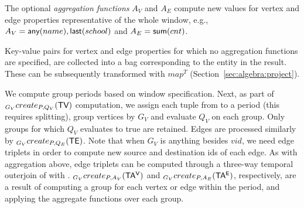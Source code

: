 The optional {\em aggregation functions} $A_V$ and $A_E$ compute new
values for vertex and edge properties representative of
the whole window, e.g., $A_V=\textsf{any}(name), \textsf{last}(school)$
and $A_E=\textsf{sum}(cnt)$.
%
 
Key-value pairs for vertex and edge properties for which no
aggregation functions are specified, are collected into a bag
corresponding to the entity in the result.  These can be subsequently
transformed with $map^T$ (Section~\ref{sec:algebra:project}).


We compute group periods based on window specification.  Next, as part
of $_{G_V}create_{P,Q_V}(\textsf{TV})$ computation, we assign each tuple from
\tv to a period (this requires splitting), group vertices by $G_V$ and
evaluate $Q_V$ on each group.  Only groups for which $Q_V$ evaluates
to true are retained.  Edges are processed similarly by
$_{G_V}create_{P,Q_E}(\textsf{TE})$.  Note that when $G_V$ is anything besides
$vid$, we need edge triplets in order to compute new source and
destination ids of each edge.  As with aggregation above, edge
triplets can be computed through a three-way temporal outerjoin of
\tae with \tav.  $_{G_V}create_{P,A_V}(\mathsf{TA^{V}})$ and
$_{G_V}create_{P,A_E}(\mathsf{TA^{E}})$, respectively, are a result of computing
a group for each vertex or edge within the period, and applying the
aggregate functions over each group.



